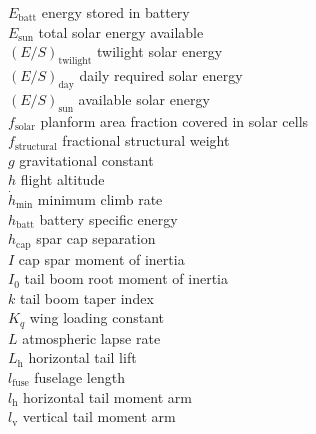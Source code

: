 \begin{multicols}{2}
\begin{tabbing}
$E_{\text{batt}}$ \> energy stored in battery \\ %
$E_{\text{sun}}$ \> total solar energy available \\ %
$(E/S)_{\text{twilight}}$ \> twilight solar energy \\ %
$(E/S)_{\text{day}}$ \> daily required solar energy \\ %
$(E/S)_{\text{sun}}$ \> available solar energy \\ %
$f_{\text{solar}}$ \> planform area fraction covered in solar cells \\
$f_{\text{structural}}$ \> fractional structural weight\\
$g$ \> gravitational constant \\ %
$h$ \> flight altitude \\ %
$\dot{h}_{\text{min}}$ \> minimum climb rate \\ %
$h_{\text{batt}}$ \> battery specific energy \\ %
$h_{\text{cap}}$ \> spar cap separation \\ %
$I$ \> cap spar moment of inertia \\ %
$I_0$ \> tail boom root moment of inertia \\ %
$k$ \> tail boom taper index \\
$K_q$ \> wing loading constant \\ %
$L$ \> atmospheric lapse rate \\ %
$L_\text{h}$ \> horizontal tail lift \\ %
$l_\text{fuse}$ \> fuselage length \\ %
$l_\text{h}$ \> horizontal tail moment arm \\ %
$l_\text{v}$ \> vertical tail moment arm \\ %

\end{tabbing}
\end{multicols}
